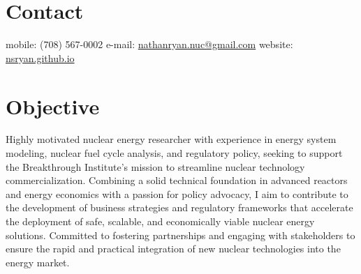 \documentclass[margin,line]{resume}
\begin{document}
\begin{resume}

%


    \section{\mysidestyle Contact}
    mobile: (708) 567-0002 \hfill e-mail: \href{mailto:nathanryan.nuc@gmail.com}{nathanryan.nuc@gmail.com} \hfill website: \href{https://nsryan.github.io}{nsryan.github.io} \vspace{0mm}\\\vspace{1mm}%

    \vspace{-6mm}
    \section{\mysidestyle Objective}
        Highly motivated nuclear energy researcher with experience in energy system modeling, nuclear fuel cycle analysis, and regulatory policy, seeking to support the Breakthrough Institute's mission to streamline nuclear technology commercialization. Combining a solid technical foundation in advanced reactors and energy economics with a passion for policy advocacy, I aim to contribute to the development of business strategies and regulatory frameworks that accelerate the deployment of safe, scalable, and economically viable nuclear energy solutions. Committed to fostering partnerships and engaging with stakeholders to ensure the rapid and practical integration of new nuclear technologies into the energy market.

\end{resume}
\end{document}
